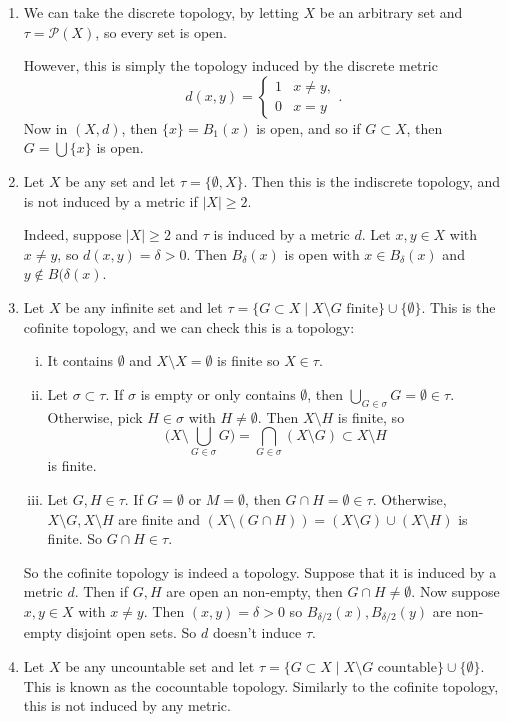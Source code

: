 \documentclass[12pt]{article}
\begin{document}
\begin{exbox}
	\begin{enumerate}[1.]
		\item We can take the discrete topology, by letting $X$ be an arbitrary set and $\tau = \mathcal{P}(X)$, so every set is open.

			However, this is simply the topology induced by the discrete metric
			\[
				d(x, y) =
				\begin{cases}
					1 & x \neq y,\\
					0 & x = y
				\end{cases}
			.\]
			Now in $(X, d)$, then $\{x\} = B_1(x)$ is open, and so if $G \subset X$, then $G = \bigcup \{x\}$ is open.
		\item Let $X$ be any set and let $\tau = \{\emptyset, X\}$. Then this is the indiscrete topology, and is not induced by a metric if $|X| \geq 2$.

			Indeed, suppose $|X| \geq 2$ and $\tau$ is induced by a metric $d$. Let $x, y \in X$ with $x \neq y$, so $d(x, y) = \delta > 0$. Then $B_{\delta}(x)$ is open with $x \in B_{\delta}(x)$ and $y \not \in B(\delta(x)$.
		\item Let $X$ be any infinite set and let $\tau = \{G \subset X \mid X \setminus G \text{ finite}\} \cup \{\emptyset\}$. This is the cofinite topology, and we can check this is a topology:
			\begin{enumerate}[(i)]
				\item It contains $\emptyset$ and $X \setminus X = \emptyset$ is finite so $X \in \tau$.
				\item Let $\sigma \subset \tau$. If $\sigma$ is empty or only contains $\emptyset$, then $\bigcup_{G \in \sigma} G = \emptyset \in \tau$. Otherwise, pick $H \in \sigma$ with $H \neq \emptyset$. Then $X \setminus H$ is finite, so
					\[
						\Biggl( X \setminus \bigcup_{G \in \sigma}G \Biggr) = \bigcap_{G \in \sigma}(X \setminus G) \subset X \setminus H
					\]
					is finite.
				\item Let $G, H \in \tau.$ If $G= \emptyset$ or $M = \emptyset$, then $G \cap H = \emptyset \in \tau$. Otherwise, $X \setminus G, X \setminus H$ are finite and $(X \setminus (G \cap H)) = (X \setminus G) \cup (X \setminus H)$ is finite. So $G \cap H \in \tau$.
			\end{enumerate}
			So the cofinite topology is indeed a topology. Suppose that it is induced by a metric $d$. Then if $G, H$ are open an non-empty, then $G \cap H \neq \emptyset$. Now suppose $x, y \in X$ with $x \neq y$. Then $(x, y) = \delta > 0$ so $B_{\delta/2}(x), B_{\delta/2}(y)$ are non-empty disjoint open sets. So $d$ doesn't induce $\tau$.
		\item Let $X$ be any uncountable set and let $\tau = \{G \subset X \mid X \setminus G \text{ countable}\} \cup \{\emptyset\}$. This is known as the cocountable topology. Similarly to the cofinite topology, this is not induced by any metric.
	\end{enumerate}
\end{exbox}
\end{document}
